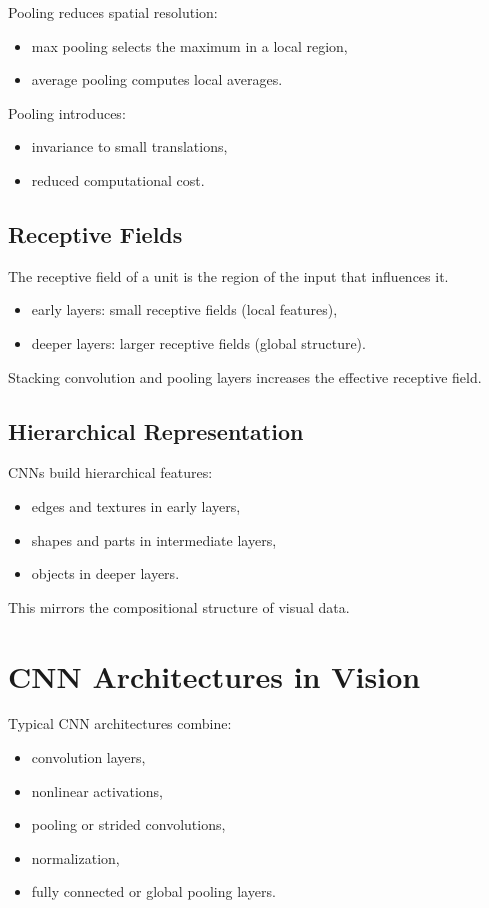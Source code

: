 Pooling reduces spatial resolution:
\begin{itemize}
    \item max pooling selects the maximum in a local region,
    \item average pooling computes local averages.
\end{itemize}

Pooling introduces:
\begin{itemize}
    \item invariance to small translations,
    \item reduced computational cost.
\end{itemize}

\subsection{Receptive Fields}

The receptive field of a unit is the region of the input that influences it.

\begin{itemize}
    \item early layers: small receptive fields (local features),
    \item deeper layers: larger receptive fields (global structure).
\end{itemize}

Stacking convolution and pooling layers increases the effective receptive field.

\subsection{Hierarchical Representation}

CNNs build hierarchical features:
\begin{itemize}
    \item edges and textures in early layers,
    \item shapes and parts in intermediate layers,
    \item objects in deeper layers.
\end{itemize}

This mirrors the compositional structure of visual data.

\section{CNN Architectures in Vision}

Typical CNN architectures combine:
\begin{itemize}
    \item convolution layers,
    \item nonlinear activations,
    \item pooling or strided convolutions,
    \item normalization,
    \item fully connected or global pooling layers.
\end{itemize}

